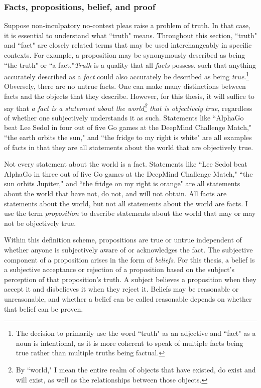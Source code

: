 \subsubsection{Facts, propositions, belief, and proof}

Suppose non-inculpatory no-contest pleas raise a problem of truth. In that case, it is essential to understand what ``truth" means. Throughout this section, ``truth" and ``fact" are closely related terms that may be used interchangeably in specific contexts. For example, a proposition may be synonymously described as being ``the truth" or ``a fact."\textit{Truth} is a quality that all \textit{facts} possess, such that anything accurately described as a \textit{fact} could also accurately be described as being \textit{true}.\footnote{The decision to primarily use the word ``truth" as an adjective and ``fact" as a noun is intentional, as it is more coherent to speak of multiple facts being true rather than multiple truths being factual.} Obversely, there are no untrue facts. One can make many distinctions between facts and the objects that they describe. However, for this thesis, it will suffice to say that \textit{a fact is a statement about the world\footnote{By ``world," I mean the entire realm of objects that have existed, do exist and will exist, as well as the relationships between those objects.} that is objectively true}, regardless of whether one subjectively understands it as such. Statements like ``AlphaGo beat Lee Sedol in four out of five Go games at the DeepMind Challenge Match," ``the earth orbits the sun," and ``the fridge to my right is white" are all examples of facts in that they are all statements about the world that are objectively true.

Not every statement about the world is a fact. Statements like ``Lee Sedol beat AlphaGo in three out of five Go games at the DeepMind Challenge Match," ``the sun orbits Jupiter," and ``the fridge on my right is orange" are all statements about the world that have not, do not, and will not obtain. All facts are statements about the world, but not all statements about the world are facts. I use the term \textit{proposition} to describe statements about the world that may or may not be objectively true.

Within this definition scheme, propositions are true or untrue independent of whether anyone is subjectively aware of or acknowledges the fact. The subjective component of a proposition arises in the form of \textit{beliefs}. For this thesis, a belief is a subjective acceptance or rejection of a proposition based on the subject's perception of that proposition's truth. A subject believes a proposition when they accept it and disbelieves it when they reject it. Beliefs may be reasonable or unreasonable, and whether a belief can be called reasonable depends on whether that belief can be proven.

